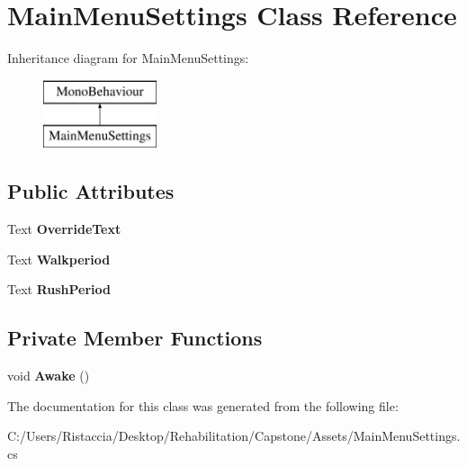 \hypertarget{class_main_menu_settings}{}\section{Main\+Menu\+Settings Class Reference}
\label{class_main_menu_settings}
Inheritance diagram for Main\+Menu\+Settings\+:\begin{figure}[H]
\begin{center}
\leavevmode
\includegraphics[height=2.000000cm]{class_main_menu_settings}
\end{center}
\end{figure}
\subsection*{Public Attributes}
\begin{DoxyCompactItemize}
\item 
\mbox{\label{class_main_menu_settings_ae003ba4b16f8a2b15d2410c5dbea089d}} 
Text {\bfseries Override\+Text}
\item 
\mbox{\label{class_main_menu_settings_a2127565ce92ee0c552028ca9f9b712f1}} 
Text {\bfseries Walkperiod}
\item 
\mbox{\label{class_main_menu_settings_a951b3b5dcdcf4b5a82a4507107b50570}} 
Text {\bfseries Rush\+Period}
\end{DoxyCompactItemize}
\subsection*{Private Member Functions}
\begin{DoxyCompactItemize}
\item 
\mbox{\label{class_main_menu_settings_affbb44bcdd688bb0978cd10c1c7357bc}} 
void {\bfseries Awake} ()
\end{DoxyCompactItemize}


The documentation for this class was generated from the following file\+:\begin{DoxyCompactItemize}
\item 
C\+:/\+Users/\+Ristaccia/\+Desktop/\+Rehabilitation/\+Capstone/\+Assets/Main\+Menu\+Settings.\+cs\end{DoxyCompactItemize}
